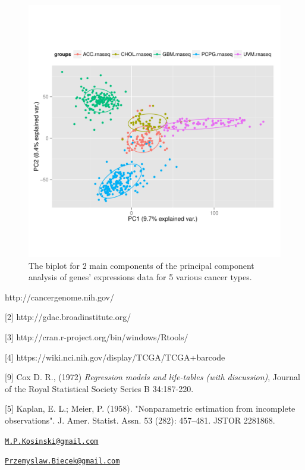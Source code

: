 \begin{figure}[h!]
\includegraphics[width=12cm]{biplot_rnaseq.pdf}
\caption{\label{biplot2}The biplot for 2 main components of the principal component analysis of genes' expressions data for 5 various cancer types.}
\end{figure}

\newpage

\begin{Schunk}
\begin{Sinput}
[1] http://cancergenome.nih.gov/

[2] http://gdac.broadinstitute.org/
   
[3] http://cran.r-project.org/bin/windows/Rtools/
   
[4] https://wiki.nci.nih.gov/display/TCGA/TCGA+barcode

[9] Cox D. R., (1972) \textit{Regression models and life-tables (with discussion)}, Journal of the Royal Statistical Society Series B 34:187-220.      
      
[5]  Kaplan, E. L.; Meier, P. (1958). "Nonparametric estimation from incomplete observations". J. Amer. Statist. Assn. 53 (282): 457–481. JSTOR 2281868.


\end{Sinput}
\end{Schunk}

\address{
Marcin Kosinski\\
Warsaw University of Technology\\
Faculty of Mathematics and Information Science\\ Koszykowa 75, 00-662 Warsaw, Poland\\
}
\href{mailto:M.P.Kosinski@gmail.com}{\nolinkurl{M.P.Kosinski@gmail.com}}

\address{
Przemysław Biecek\\
University of Warsaw\\
Faculty of Mathematics, Informatics, and Mechanics\\ Banacha 2, 02-097 Warsaw, Poland\\
}
\href{mailto:Przemyslaw.Biecek@gmail.com}{\nolinkurl{Przemyslaw.Biecek@gmail.com}}

